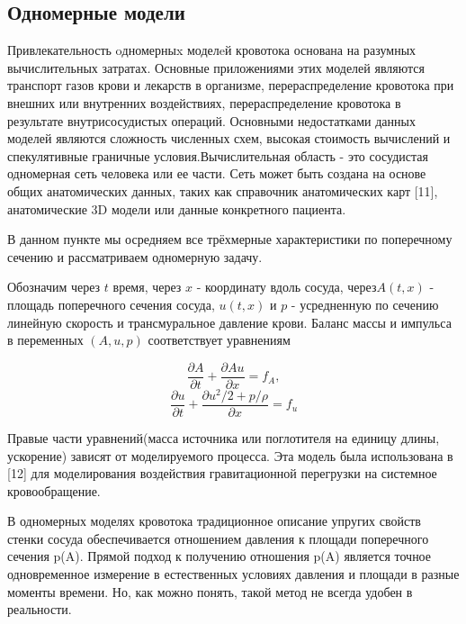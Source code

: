 \subsection{Одномерные модели}

Привлекательность oдномерныx моделeй кровотока основана на разумных вычислительных затратах. Основные приложениями этих моделей являются транспорт газов крови и лекарств в организме, перераспределение кровотока при внешних или внутренних воздействиях, перераспределение кровотока в результате внутрисосудистых операций. Основными недостатками данных моделей являются сложность численных схем, высокая стоимость вычислений и спекулятивные граничные условия.Вычислительная область - это сосудистая одномерная сеть человека или ее части. Сеть может быть создана на основе общих анатомических данных, таких как справочник анатомических карт [11], анатомические 3D модели или данные конкретного пациента.

В данном пункте мы осредняем все трёхмерные характеристики по поперечному сечению и рассматриваем одномерную задачу.

Обозначим через $t$ время, через $x$ - координату вдоль сосуда, через$A(t, x)$ - площадь поперечного сечения сосуда, $u(t, x)$ и $p$ - усредненную по сечению линейную скорость и трансмуральное давление крови. Баланс массы и импульса в переменных $(A, u, p)$ соответствует уравнениям

\begin{equation}
	\label{eq:mass-balance}
	\frac{\partial A}{\partial t}+\frac{\partial Au}{\partial x}=f_A,
\end{equation}
\begin{equation}
	\label{eq:momentum-balance}
	\frac{\partial u}{\partial t}+ \frac{\partial u^2/2+p/\rho}{\partial x}=f_u
\end{equation}

Правые части уравнений(масса источника или поглотителя на единицу длины, ускорение) зависят от моделируемого процесса. Эта модель была использована в [12] для моделирования воздействия гравитационной перегрузки на системное кровообращение. 

В одномерных моделях кровотока традиционное описание упругих свойств стенки сосуда обеспечивается отношением давления к площади поперечного сечения p(A). Прямой подход к получению отношения p(A) является точное одновременное измерение в естественных условиях давления и площади в разные моменты времени. Но, как можно понять, такой метод не всегда удобен в реальности.

